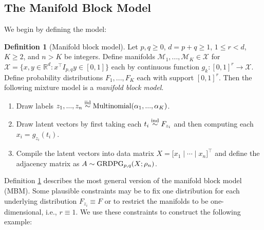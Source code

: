 \documentclass[
  12pt,
]{article}
\theoremstyle{definition}
\newtheorem{definition}{Definition}[section]
\theoremstyle{definition}
\theoremstyle{definition}
\theoremstyle{definition}
\theoremstyle{remark}
\begin{document}
\hypertarget{the-manifold-block-model}{%
\subsection{The Manifold Block Model}\label{the-manifold-block-model}}

We begin by defining the model:

\begin{definition}[Manifold block model]
\label{def:mbm}
Let $p, q \geq 0$, $d = p + q \geq 1$, $1 \leq r < d$, $K \geq 2$, and $n > K$ be integers. 
Define manifolds $\mathcal{M}_1, ..., \mathcal{M}_K \in \mathcal{X}$ for $\mathcal{X} = \{x, y \in \mathbb{R}^d : x^\top I_{p,q} y \in [0, 1]\}$ each by continuous function $g_k : [0, 1]^r \to \mathcal{X}$. 
Define probability distributions $F_1, ..., F_K$ each with support $[0, 1]^r$. 
Then the following mixture model is a {\em manifold block model}.

\begin{enumerate}
\item Draw labels $z_1, ..., z_n \stackrel{\mathrm{iid}}{\sim} \mathrm{Multinomial}(\alpha_1, ..., \alpha_K)$.
\item Draw latent vectors by first taking each $t_i \stackrel{\mathrm{ind}}{\sim} F_{z_i}$ and then computing each $x_i = g_{z_i}(t_i)$. 
\item Compile the latent vectors into data matrix $X = \Big[ x_1 \mid \cdots \mid x_n \Big]^\top$ and define the adjacency matrix as $A \sim \mathrm{GRDPG}_{p,q}(X; \rho_n)$. 
\end{enumerate}
\end{definition}

Definition \ref{def:mbm} describes the most general version of the manifold block model (MBM).
Some plausible constraints may be to fix one distribution for each underlying distribution \(F_{z_i} \equiv F\) or to restrict the manifolds to be one-dimensional, i.e., \(r \equiv 1\).
We use these constraints to construct the following example:
\end{document}
